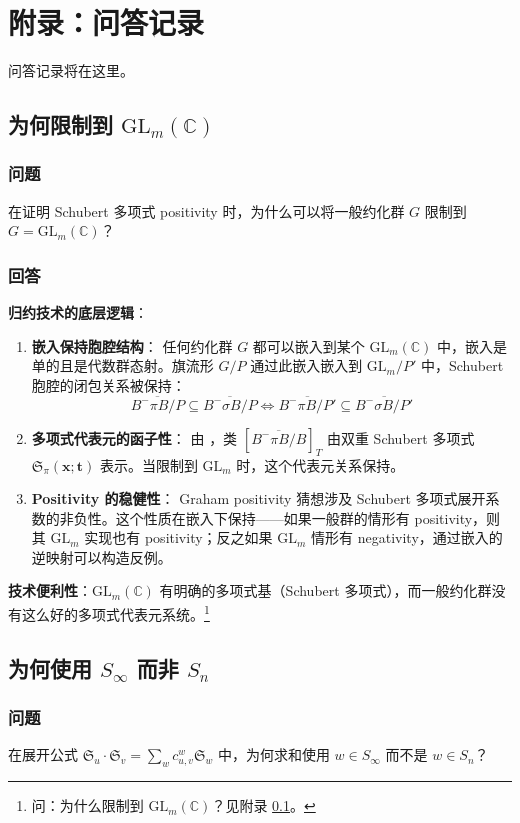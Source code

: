 \chapter*{附录：问答记录}
\label{chap:Appendix}

问答记录将在这里。
\section{为何限制到 $\mathrm{GL}_m(\mathbb{C})$}\label{sec:why-GLm}
\subsection{问题}
在证明 Schubert 多项式 positivity 时，为什么可以将一般约化群 $G$ 限制到 $G = \mathrm{GL}_m(\mathbb{C})$？
\subsection{回答}
\textbf{归约技术的底层逻辑}：
\begin{enumerate}
\item \textbf{嵌入保持胞腔结构}：
任何约化群 $G$ 都可以嵌入到某个 $\mathrm{GL}_m(\mathbb{C})$ 中，嵌入是单的且是代数群态射。旗流形 $G/P$ 通过此嵌入嵌入到 $\mathrm{GL}_m/P'$ 中，Schubert 胞腔的闭包关系被保持：$$\overline{B^-\pi B/P} \subseteq \overline{B^-\sigma B/P} \iff \overline{B^-\pi B/P'} \subseteq \overline{B^-\sigma B/P'}$$\item \textbf{多项式代表元的函子性}：
由 \cite[ Theorem 10.6.4]{anderson2023}，类 $[\overline{B^-\pi B/B}]_T$ 由双重 Schubert 多项式 $\mathfrak{S}_\pi(\mathbf{x}; \mathbf{t})$ 表示。当限制到 $\mathrm{GL}_m$ 时，这个代表元关系保持。\item \textbf{Positivity 的稳健性}：
Graham positivity 猜想涉及 Schubert 多项式展开系数的非负性。这个性质在嵌入下保持——如果一般群的情形有 positivity，则其 $\mathrm{GL}_m$ 实现也有 positivity；反之如果 $\mathrm{GL}_m$ 情形有 negativity，通过嵌入的逆映射可以构造反例。
\end{enumerate}

\textbf{技术便利性}：$\mathrm{GL}_m(\mathbb{C})$ 有明确的多项式基（Schubert 多项式），而一般约化群没有这么好的多项式代表元系统。\footnote{问：为什么限制到 $\mathrm{GL}_m(\mathbb{C})$？见附录 \cref{sec:why-GLm}。}
\section{为何使用 $S_\infty$ 而非 $S_n$}\label{sec:Sinfty-vs-Sn}
\subsection{问题}
在展开公式 $\mathfrak{S}_u \cdot \mathfrak{S}_v = \sum_w c^w_{u,v} \mathfrak{S}_w$ 中，为何求和使用 $w \in S_\infty$ 而不是 $w \in S_n$？
